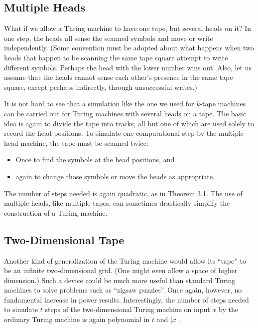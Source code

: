 \vspace*{\fill}
\columnbreak

\subsection{Multiple Heads}

What if we allow a Thring machine to have one tape, but several heads on it? In one step, the heads all sense the scanned symbols and move or write independently. (Some convention must be adopted about what happens when two heads that happen to be scanning the same tape square attempt to write different symbols. Perhaps the head with the lower number wins out. Also, let us assume that the heads cannot sense each other's presence in the same tape square, except perhaps indirectly, through unsuccessful writes.)

It is not hard to see that a simulation like the one we used for $k$-tape machines can be carried out for Turing machines with several heads on a tape. The basic idea is again to divide the tape into tracks, all but one of which are used solely to record the head positions. To simulate one computational step by the multiple-head machine, the tape must be scanned twice:
\begin{itemize}
  \item Once to find the symbols at the head positions, and 
  \item again to change those symbols or move the heads as appropriate.
\end{itemize}
The number of steps needed is again quadratic, as in Theorem 3.1. The use of multiple heads, like multiple tapes, can sometimes drastically simplify the construction of a Turing machine.

\subsection{Two-Dimensional Tape}

Another kind of generalization of the Turing machine would allow its ``tape'' to be an infinite two-dimensional grid. (One might even allow a space of higher dimension.) Such a device could be much more useful than standard Turing machines to solve problems such as ``zigsaw puzzles''. Once again, however, no fundamental increase in power results. Interestingly, the number of steps needed to simulate $t$ steps of the two-dimensional Turing machine on input $x$ by the ordinary Turing machine is again polynomial in $t$ and $|x|$.

